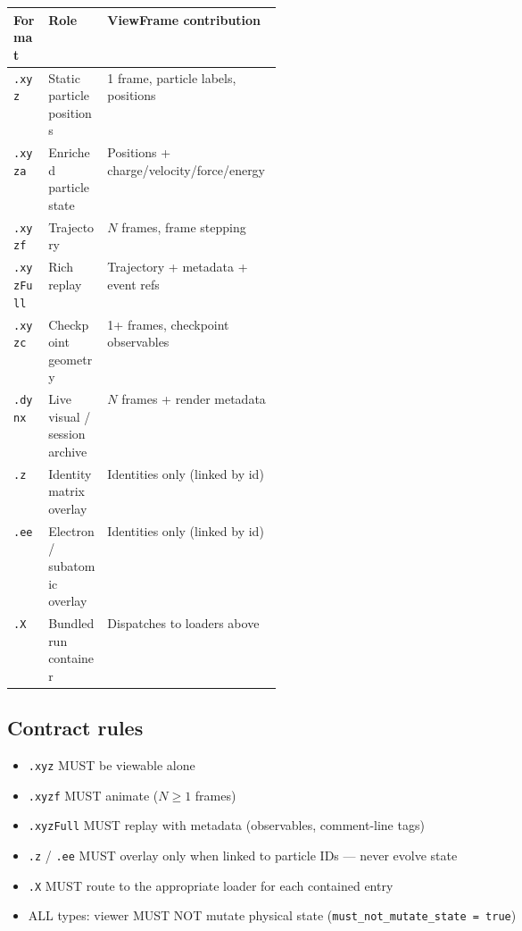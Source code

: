 ﻿\documentclass[11pt,a4paper]{article}
\newcommand{\chk}{\textcolor{Teal}{\textbf{\checkmark}}\;}
\begin{document}
\begin{center}
\begin{tabularx}{\linewidth}{@{}p{0.13\linewidth}p{0.22\linewidth}X@{}}
\toprule
\textbf{Format} & \textbf{Role} & \textbf{ViewFrame contribution} \\
\midrule
\texttt{.xyz}     & Static particle positions & 1 frame, particle labels, positions \\
\texttt{.xyza}    & Enriched particle state & Positions + charge/velocity/force/energy \\
\texttt{.xyzf}    & Trajectory & $N$ frames, frame stepping \\
\texttt{.xyzFull} & Rich replay & Trajectory + metadata + event refs \\
\texttt{.xyzc}    & Checkpoint geometry & 1+ frames, checkpoint observables \\
\texttt{.dynx}    & Live visual / session archive & $N$ frames + render metadata \\
\texttt{.z}       & Identity matrix overlay & Identities only (linked by id) \\
\texttt{.ee}      & Electron / subatomic overlay & Identities only (linked by id) \\
\texttt{.X}       & Bundled run container & Dispatches to loaders above \\
\bottomrule
\end{tabularx}
\end{center}

\subsection*{Contract rules}

\begin{itemize}[leftmargin=*,itemsep=2pt]
  \item[\chk] \texttt{.xyz} MUST be viewable alone
  \item[\chk] \texttt{.xyzf} MUST animate ($N \geq 1$ frames)
  \item[\chk] \texttt{.xyzFull} MUST replay with metadata (observables, comment-line tags)
  \item[\chk] \texttt{.z} / \texttt{.ee} MUST overlay only when linked to particle IDs --- never evolve state
  \item[\chk] \texttt{.X} MUST route to the appropriate loader for each contained entry
  \item[\chk] ALL types: viewer MUST NOT mutate physical state (\texttt{must\_not\_mutate\_state = true})
\end{itemize}
\end{document}
